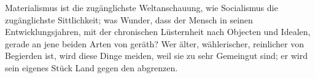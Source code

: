 Materialismus ist die zugänglichste Weltanschauung, wie Socialismus die zugänglichste Sittlichkeit; was Wunder, dass der Mensch in seinen Entwicklungsjahren, mit der chronischen Lüsternheit nach Objecten und Idealen, gerade an jene beiden Arten von  geräth? Wer älter, wählerischer, reinlicher von Begierden ist, wird diese Dinge meiden, weil sie zu sehr Gemeingut sind; er wird sein eigenes Stück Land gegen den  abgrenzen.
\par

